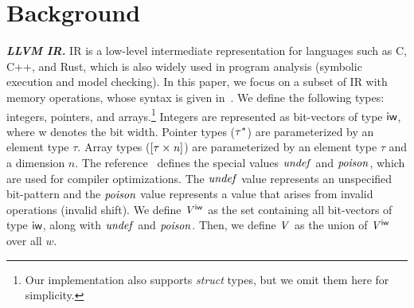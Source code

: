 \section{Background}
\label{sec:background}



\noindent \textit{\textbf{LLVM IR.}}
\llvm IR is a low-level intermediate representation for languages such as C, C++, and Rust,
which is also widely used in program analysis (\eg symbolic execution and model checking).
In this paper,
we focus on a subset of \llvm IR with memory operations, whose syntax is given in~.
We define the following types: integers, pointers, and arrays.\footnote{
Our implementation also supports \textit{struct} types, but we omit them here for simplicity.
}
Integers are represented as bit-vectors of type $\textsf{iw}$, where \textsf{w} denotes the bit width.
Pointer types ($\mathit{\tau^{*}}$) are parameterized by an element type $\tau$.
Array types ($\mathit{[\tau \times n]}$) are parameterized by an element type $\tau$ and a dimension $n$.
The \llvm reference~\cite{llvmref} defines the special values $\mathit{undef}$ and $\mathit{poison}$,
which are used for compiler optimizations.
The $\mathit{undef}$ value represents an unspecified bit-pattern
and the $\mathit{poison}$ value represents a value that arises from invalid operations (\eg invalid shift).
We define $\mathit{V}^{\textsf{iw}}$ as the set containing all bit-vectors of type $\textsf{iw}$, along with $\mathit{undef}$ and $\mathit{poison}$.
Then, we define $\mathit{V}$ as the union of $\mathit{V}^{\textsf{iw}}$ over all $w$.



